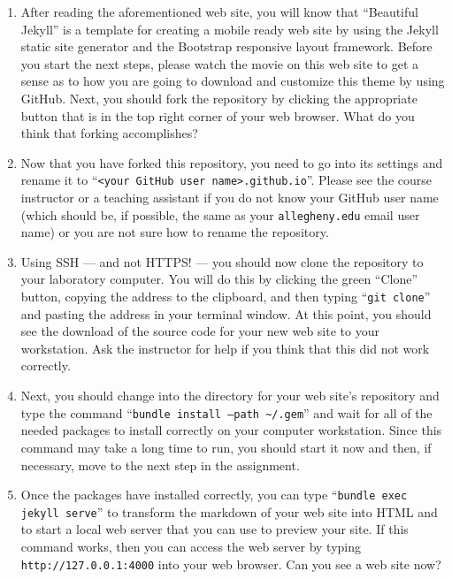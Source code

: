 \vspace*{-.15in}
\begin{enumerate}

  \itemsep0in

  \item After reading the aforementioned web site, you will know that ``Beautiful Jekyll'' is a template for creating a
    mobile ready web site by using the Jekyll static site generator and the Bootstrap responsive layout framework.
    Before you start the next steps, please watch the movie on this web site to get a sense as to how you are going to
    download and customize this theme by using GitHub. Next, you should fork the repository by clicking the appropriate
    button that is in the top right corner of your web browser. What do you think that forking accomplishes?

  \item Now that you have forked this repository, you need to go into its settings and rename it to ``{\tt <your GitHub
    user name>.github.io}''. Please see the course instructor or a teaching assistant if you do not know your GitHub
    user name (which should be, if possible, the same as your {\tt allegheny.edu} email user name) or you are not sure
    how to rename the repository.

  \item Using SSH --- and not HTTPS! --- you should now clone the repository to your laboratory computer. You will do
    this by clicking the green ``Clone'' button, copying the address to the clipboard, and then typing ``{\tt git
    clone}'' and pasting the address in your terminal window. At this point, you should see the download of the source
    code for your new web site to your workstation. Ask the instructor for help if you think that this did not work
    correctly.

  \item Next, you should change into the directory for your web site's repository and type the command ``{\tt bundle
    install --path \textasciitilde{}/.gem}'' and wait for all of the needed packages to install correctly on your
    computer workstation. Since this command may take a long time to run, you should start it now and then, if
    necessary, move to the next step in the assignment.

  \item Once the packages have installed correctly, you can type ``{\tt bundle exec jekyll serve}'' to transform the
    markdown of your web site into HTML and to start a local web server that you can use to preview your site. If this
    command works, then you can access the web server by typing {\tt http://127.0.0.1:4000} into your web browser. Can
    you see a web site now?


\end{enumerate}
